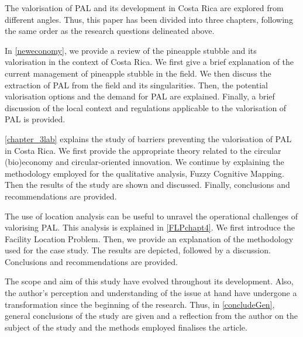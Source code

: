 The valorisation of PAL and its development in Costa Rica are explored from different angles. Thus, this paper has been divided into three chapters, following the same order as the research questions delineated above.

In \cref{neweconomy}, we provide a review of the pineapple stubble and its valorisation in the context of Costa Rica. We first give a brief explanation of the current management of pineapple stubble in the field. We then discuss the extraction of PAL from the field and its singularities. Then, the potential valorisation options and the demand for PAL are explained. Finally, a brief discussion of the local context and regulations applicable to the valorisation of PAL is provided.

\cref{chapter_3lab} explains the study of barriers preventing the valorisation of PAL in Costa Rica. We first provide the appropriate theory related to the circular (bio)economy and circular-oriented innovation. We continue by explaining the methodology employed for the qualitative analysis, Fuzzy Cognitive Mapping. Then the results of the study are shown and discussed. Finally, conclusions and recommendations are provided. 

The use of location analysis can be useful to unravel the operational challenges of valorising PAL. This analysis is explained in \cref{FLPchapt4}. We first introduce the Facility Location Problem. Then, we provide an explanation of the methodology used for the case study. The results are depicted, followed by a discussion. Conclusions and recommendations are provided. 

The scope and aim of this study have evolved throughout its development. Also, the author's perception and understanding of the issue at hand have undergone a transformation since the beginning of the research. Thus, in \cref{concludeGen}, general conclusions of the study are given and a reflection from the author on the subject of the study and the methods employed finalises the article. 

